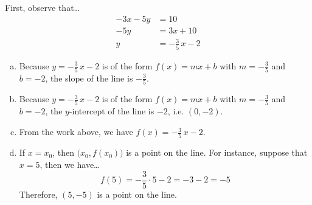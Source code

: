 \documentclass[11pt,letterpaper]{article}
\begin{document}
\sol First, observe that\dots
	\[
	\begin{aligned}
	-3x - 5y&= 10 \\[0.3cm]
	-5y&= 3x + 10 \\[0.3cm]
	y&= -\frac{3}{5}\,x - 2
	\end{aligned}
	\]

\begin{enumerate}[(a)]
\item Because $y= -\frac{3}{5}\,x - 2$ is of the form $f(x)= mx + b$ with $m= -\frac{3}{5}$ and $b= -2$, the slope of the line is $-\frac{3}{5}$. \pspace

\item Because $y= -\frac{3}{5}\,x - 2$ is of the form $f(x)= mx + b$ with $m= -\frac{3}{5}$ and $b= -2$, the $y$-intercept of the line is $-2$, i.e. $(0, -2)$. \pspace

\item From the work above, we have $f(x)= -\frac{3}{5}\,x - 2$. \pspace

\item If $x= x_0$, then $\big(x_0, f(x_0) \big)$ is a point on the line. For instance, suppose that $x= 5$, then we have\dots
	\[
	f(5)= -\dfrac{3}{5} \cdot 5 - 2= -3 - 2= -5
	\]
Therefore, $(5, -5)$ is a point on the line. 
\end{enumerate}
\end{document}
